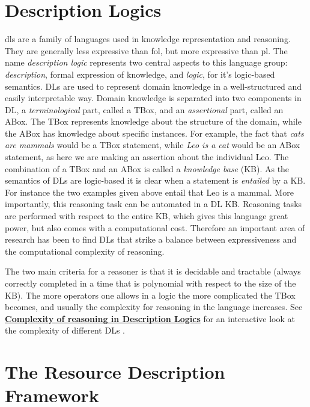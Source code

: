 \section{Description Logics}
\gls{dls} are a family of languages used in knowledge representation and reasoning. They are generally less expressive than \gls{fol}, but more expressive than \gls{pl}. The name \textit{description logic} represents two central aspects to this language group: \emph{description}, formal expression of knowledge, and  \emph{logic}, for it's logic-based semantics. DLs are used to represent domain knowledge in a well-structured and easily interpretable way. Domain knowledge is separated into two components in DL, a \emph{terminological} part, called a TBox, and an \emph{assertional} part, called an ABox. The TBox represents knowledge about the structure of the domain, while the ABox has knowledge about specific instances. For example, the fact that \emph{cats are  mammals} would be a TBox statement, while \emph{Leo is a cat} would be an ABox statement, as here we are making an assertion about the individual Leo. The combination of a TBox and an ABox is called a \emph{knowledge base} (KB).
As the semantics of DLs are logic-based it is clear when a statement is \emph{entailed} by a KB. For instance the two examples given above entail that Leo is a mammal. More importantly, this reasoning task can be automated in a DL KB. Reasoning tasks are performed with respect to the entire KB, which gives this language great power, but also comes with a computational cost. Therefore an important area of research has been to find DLs that strike a balance between expressiveness and the computational complexity of reasoning.


The two main criteria for a reasoner is that it is decidable and tractable (always correctly completed in a time that is polynomial with respect to the size of the KB). The more operators one allows in a logic the more complicated the TBox becomes, and usually the complexity for reasoning in the language increases. See \href{http://www.cs.man.ac.uk/~ezolin/dl/}{\textbf{Complexity of reasoning in Description Logics}} for an interactive look at the complexity of different DLs \cite{zolin_2013}.

\section{The Resource Description Framework}


